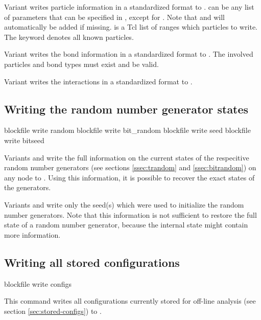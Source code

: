   Variant  writes
particle information in a standardized format to .
 can be any list of parameters that can be specified in
, except for .  Note that
 and  will automatically be added if missing.
 is a Tcl list of ranges which particles to write.  The
keyword  denotes all known particles.

Variant  writes the bond information in a standardized
format to . The involved particles and bond types must
exist and be valid.

Variant  writes the interactions in a standardized format
to .

\subsection{Writing the random number generator states}
\begin{essyntax}
   blockfile  write random
   blockfile  write bit_random
   blockfile  write seed
   blockfile  write bitseed
\end{essyntax}

Variants  and  write the full information on the
current states of the respecitive random number generators (see
sections \vref{ssec:trandom} and \vref{ssec:bitrandom}) on any node to
.  Using this information, it is possible to recover the
exact states of the generators.

Variants  and  write only the seed(s) which were
used to initialize the random number generators. Note that this
information is not sufficient to restore the full state of a random
number generator, because the internal state might contain more
information.

\subsection{Writing all stored configurations}
\label{sec:blockfile:configs}
\begin{essyntax}
  blockfile  write configs
\end{essyntax}

This command writes all configurations currently stored for off-line
analysis (see section \vref{sec:stored-configs}) to .

